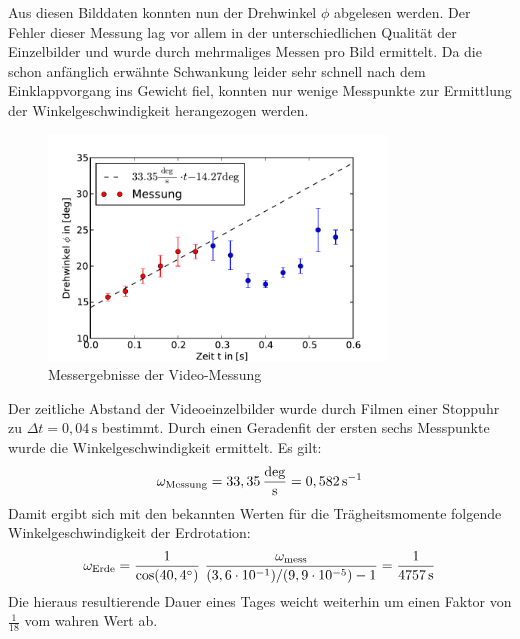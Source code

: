 \documentclass[11pt]{scrartcl}
\newcommand{\unit}[1]{\ensuremath{\,\mathrm{#1}}} %
\newcommand{\degr}{\ensuremath{^\circ}}
\newcommand{\ee}[1]{\ensuremath{\cdot 10^{#1}}}
\newcommand{\ltext}[1]{\ensuremath{_{\textnormal{#1}}}}
\begin{document}
Aus diesen Bilddaten konnten nun der Drehwinkel $\phi$ abgelesen werden. Der Fehler dieser Messung lag vor allem in der unterschiedlichen Qualität der Einzelbilder und wurde durch mehrmaliges Messen pro Bild ermittelt.
Da die schon anfänglich erwähnte Schwankung leider sehr schnell nach dem Einklappvorgang ins Gewicht fiel, konnten nur wenige Messpunkte zur Ermittlung der Winkelgeschwindigkeit herangezogen werden.
\begin{figure}[h]
\begin{center}
\includegraphics[width=0.8\textwidth]{messung_Video.pdf}
\end{center}
\vspace{-1.5\baselineskip}
\caption{Messergebnisse der Video-Messung}
\label{messung_Video}
\end{figure}
Der zeitliche Abstand der Videoeinzelbilder wurde durch Filmen einer Stoppuhr zu $\Delta t = 0,04\unit{s}$ bestimmt.
Durch einen Geradenfit der ersten sechs Messpunkte wurde die Winkelgeschwindigkeit ermittelt. Es gilt:
\begin{equation}
\omega\ltext{Messung} = 33,35 \unit{\frac{deg}{s}} = 0,582 \unit{s^{-1}}
\end{equation}
Damit ergibt sich mit den bekannten Werten für die Trägheitsmomente folgende Winkelgeschwindigkeit der Erdrotation:
\begin{equation}
\omega\ltext{Erde} = 
\frac{1}{\cos(40,4\degr)}\ 
\frac{\omega\ltext{mess}}{(3,6\ee{-1}) / (9,9\ee{-5}) - 1}
= \frac{1}{4757\unit{s}}
\end{equation}
Die hieraus resultierende Dauer eines Tages weicht weiterhin um einen Faktor von $\frac{1}{18}$ vom wahren Wert ab.


\FloatBarrier
\end{document}
